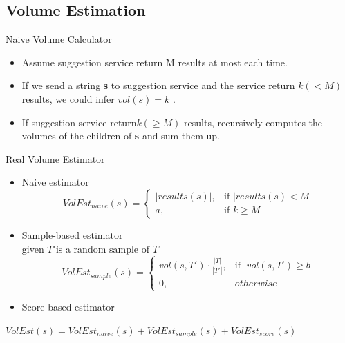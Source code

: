 \documentclass{beamer}
\newcommand{\str}{\textbf{s} }
\begin{document}
    \subsection{Volume Estimation}
    \begin{frame}{Naive Volume Calculator}
        \begin{itemize}
        \item Assume suggestion service return M results at most each time.
        \item If we send a string \str to suggestion service and the service return $ k(<M) $ results, we could infer $ vol(s) = k $ .
        \item If suggestion service return$ k(\ge M) $ results, recursively computes the volumes of the children of \str and sum them up.
        \end{itemize}
    \end{frame}

    \begin{frame}{Real Volume Estimator}
        \begin{itemize}
        \item Naive estimator
            \begin{equation*}
            VolEst_{naive}(s)=\left\{
                \begin{array}{rl}
                    |results(s)|, & \text{if } |results(s) < M \\
                    a, & \text{if } k \ge M
                \end{array} \right.
            \end{equation*}
        \item Sample-based estimator \\
            given $ T' \text{is a random sample of } T $
            \begin{equation*}
            VolEst_{sample}(s)=\left\{
                \begin{array}{rl}
                    vol(s, T') \cdot \frac{|T|}{|T'|}, & \text{if } |vol(s, T') \ge b \\
                    0, & otherwise
                \end{array} \right.
            \end{equation*}
        \item Score-based estimator
        \end{itemize}

        \begin{theorem}
        $ VolEst(s) = VolEst_{naive}(s) + VolEst_{sample}(s) + VolEst_{score}(s) $
        \end{theorem}
    \end{frame}
\end{document}
